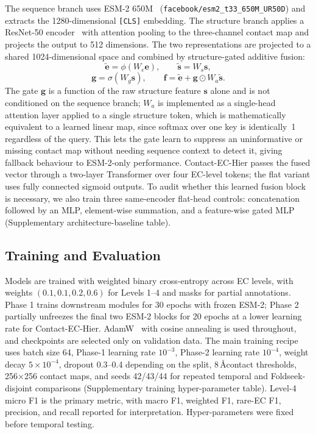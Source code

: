 \documentclass[numbered,contemporary,mediumone]{oup-authoring-template}
\begin{document}
The sequence branch uses ESM-2 650M~\citep{lin2023}
(\texttt{facebook/esm2\_t33\_650M\_UR50D}) and extracts the 1280-dimensional
\texttt{[CLS]} embedding. The structure branch applies a ResNet-50 encoder~\citep{he2016} with
attention pooling to the three-channel contact map and projects the output to 512
dimensions. The two representations are projected to a shared 1024-dimensional
space and combined by structure-gated additive fusion:
\[
\tilde{\mathbf{e}} = \phi(W_e\mathbf{e}), \qquad
\tilde{\mathbf{s}} = W_s\mathbf{s},
\]
\[
\mathbf{g} = \sigma(W_g\mathbf{s}),
\qquad
\mathbf{f} = \tilde{\mathbf{e}} + \mathbf{g}\odot W_a\tilde{\mathbf{s}}.
\]
The gate $\mathbf{g}$ is a function of the raw structure feature
$\mathbf{s}$ alone and is not conditioned on the sequence branch; $W_a$ is
implemented as a single-head attention layer applied to a single
structure token, which is mathematically equivalent to a learned linear
map, since softmax over one key is identically~1 regardless of the
query. This lets the gate learn to suppress an uninformative or missing
contact map without needing sequence context to detect it, giving
fallback behaviour to ESM-2-only performance.
Contact-EC-Hier passes the fused vector through a two-layer Transformer over four
EC-level tokens; the flat variant uses fully connected sigmoid outputs.
To audit whether this learned fusion block is necessary, we also train three
same-encoder flat-head controls: concatenation followed by an MLP, element-wise
summation, and a feature-wise gated MLP (Supplementary architecture-baseline
table).

\subsection{Training and Evaluation}

Models are trained with weighted binary cross-entropy across EC levels, with
weights $(0.1,0.1,0.2,0.6)$ for Levels 1--4 and masks for partial annotations.
Phase 1 trains downstream modules for 30 epochs with frozen ESM-2; Phase 2
partially unfreezes the final two ESM-2 blocks for 20 epochs at a lower learning
rate for Contact-EC-Hier. AdamW~\citep{loshchilov2019} with cosine annealing is used throughout, and checkpoints are selected
only on validation data. The main training recipe uses batch size 64, Phase-1
learning rate $10^{-3}$, Phase-2 learning rate $10^{-4}$, weight decay
$5\times10^{-4}$, dropout 0.3--0.4 depending on the split, 8\,\AA contact
thresholds, 256$\times$256 contact maps, and seeds 42/43/44 for repeated
temporal and Foldseek-disjoint comparisons (Supplementary training
hyper-parameter table). Level-4 micro F1 is the primary metric, with macro F1,
weighted F1, rare-EC F1, precision, and recall reported for interpretation.
Hyper-parameters were fixed before temporal testing.
\end{document}
